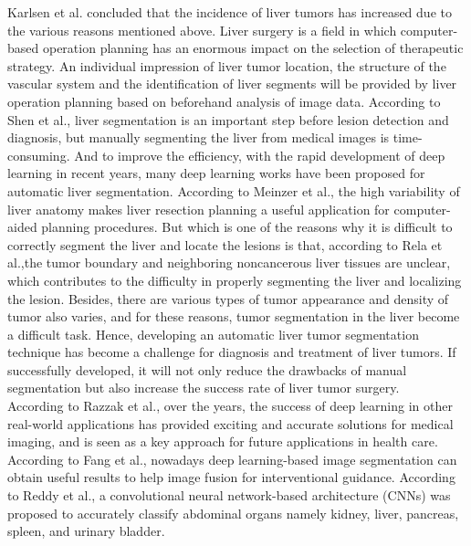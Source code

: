 \documentclass[12pt, a4paper]{article}
\begin{document}
\setlength{\parindent}{1em}
Karlsen et al.\cite{1} concluded that the incidence of liver tumors has increased due to the various reasons mentioned above. Liver surgery is a field in which computer-based operation planning has an enormous impact on the selection of therapeutic strategy. An individual impression of liver tumor location, the structure of the vascular system and the identification of liver segments will be provided by liver operation planning based on beforehand analysis of image data. According to Shen et al.\cite{2}, liver segmentation is an important step before lesion detection and diagnosis, but manually segmenting the liver from medical images is time-consuming. And to improve the efficiency, with the rapid development of deep learning in recent years, many deep learning works have been proposed for automatic liver segmentation. According to Meinzer et al.\cite{3}, the high variability of liver anatomy makes liver resection planning a useful application for computer-aided planning procedures. But which is one of the reasons why it is difficult to correctly segment the liver and locate the lesions is that, according to Rela et al.\cite{4},the tumor boundary and neighboring noncancerous liver tissues are unclear, which contributes to the difficulty in properly segmenting the liver and localizing the lesion. Besides, there are various types of tumor appearance and density of tumor also varies, and for these reasons, tumor segmentation in the liver become a difficult task. Hence, developing an automatic liver tumor segmentation technique has become a challenge for diagnosis and treatment of liver tumors. If successfully developed, it will not only reduce the drawbacks of manual segmentation but also increase the success rate of liver tumor surgery.\\

\setlength{\parindent}{1em}
According to Razzak et al.\cite{5}, over the years, the success of deep learning in other real-world applications has provided exciting and accurate solutions for medical imaging, and is seen as a key approach for future applications in health care.\\

\setlength{\parindent}{1em}
According to Fang et al.\cite{6}, nowadays deep learning-based image segmentation can obtain useful results to help image fusion for interventional guidance.
According to Reddy et al.\cite{7}, a convolutional neural network-based architecture (CNNs) was proposed to accurately classify abdominal organs namely kidney, liver, pancreas, spleen, and urinary bladder.\\
\end{document}
